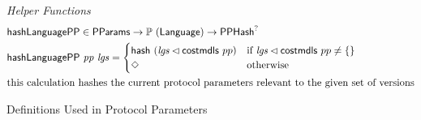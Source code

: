 \begin{figure*}[htb]
  \emph{Helper Functions}
  \begin{align*}
    & \mathsf{hashLanguagePP} \in \mathsf{PParams} \to \mathbb{P}~(\mathsf{Language}) \to \mathsf{PPHash}^?   \\
    & \mathsf{hashLanguagePP}~\mathit{pp}~\mathit{lgs} = \begin{cases}
         \mathsf{hash}~(\mathit{lgs} \lhd \mathsf{costmdls}~{pp})
                           & \text{if~} \mathit{lgs} \lhd \mathsf{costmdls}~{pp} \neq \{\} \\
              \Diamond & \text{otherwise} \\
      \end{cases} \\
    & \text{this calculation hashes the current protocol parameters relevant to
    the given set of versions}
  \end{align*}
  \caption{Definitions Used in Protocol Parameters}
  \label{fig:defs:protocol-parameters}
\end{figure*}


\clearpage
